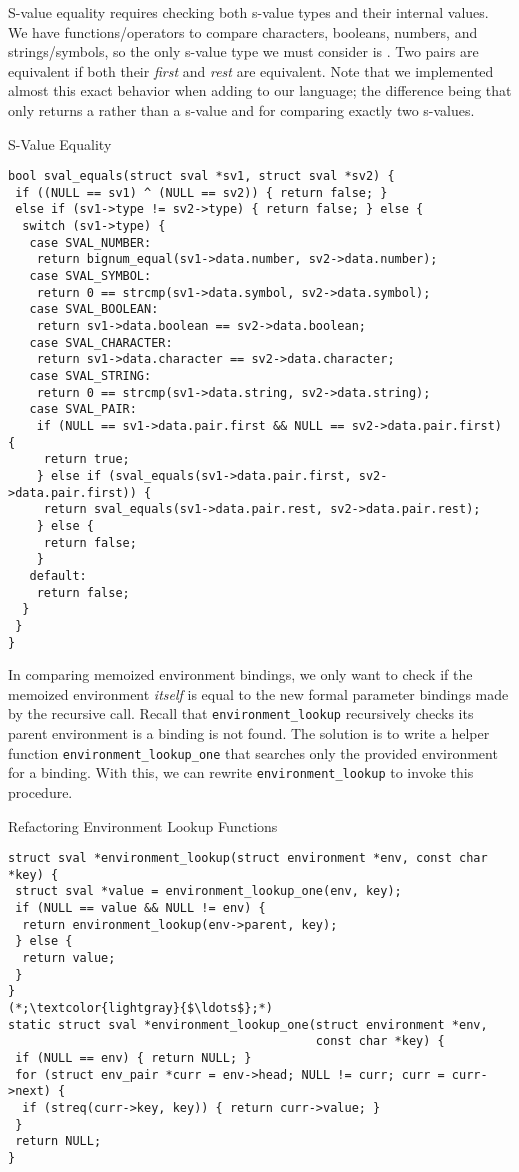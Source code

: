S-value equality requires checking both s-value types and their internal values. We have functions/operators to compare characters, booleans, numbers, and strings/symbols, so the only s-value type we must consider is . Two pairs are equivalent if both their \textit{first} and \textit{rest} are equivalent. Note that we implemented almost this exact behavior when adding  to our language; the difference being that  only returns a  rather than a  s-value and for comparing exactly two s-values.

\begin{cl}[sval.c]{S-Value Equality}
\begin{lstlisting}[language=MyC]
bool sval_equals(struct sval *sv1, struct sval *sv2) {
 if ((NULL == sv1) ^ (NULL == sv2)) { return false; } 
 else if (sv1->type != sv2->type) { return false; } else {
  switch (sv1->type) {
   case SVAL_NUMBER:
    return bignum_equal(sv1->data.number, sv2->data.number);
   case SVAL_SYMBOL:
    return 0 == strcmp(sv1->data.symbol, sv2->data.symbol);
   case SVAL_BOOLEAN:
    return sv1->data.boolean == sv2->data.boolean;
   case SVAL_CHARACTER:
    return sv1->data.character == sv2->data.character;
   case SVAL_STRING:
    return 0 == strcmp(sv1->data.string, sv2->data.string);
   case SVAL_PAIR:
    if (NULL == sv1->data.pair.first && NULL == sv2->data.pair.first) {
     return true;
    } else if (sval_equals(sv1->data.pair.first, sv2->data.pair.first)) {
     return sval_equals(sv1->data.pair.rest, sv2->data.pair.rest);
    } else {
     return false;
    }
   default:
    return false;
  }
 }
}
\end{lstlisting}
\end{cl}

In comparing memoized environment bindings, we only want to check if the memoized environment \textit{itself} is equal to the new formal parameter bindings made by the recursive call. Recall that \texttt{environment\_lookup} recursively checks its parent environment is a binding is not found. The solution is to write a helper function \texttt{environment\_lookup\_one} that searches only the provided environment for a binding. With this, we can rewrite \texttt{environment\_lookup} to invoke this procedure.

\begin{cl}[env.c]{Refactoring Environment Lookup Functions}\begin{lstlisting}[language=MyC]
struct sval *environment_lookup(struct environment *env, const char *key) {
 struct sval *value = environment_lookup_one(env, key);
 if (NULL == value && NULL != env) { 
  return environment_lookup(env->parent, key); 
 } else { 
  return value; 
 }
}
(*;\textcolor{lightgray}{$\ldots$};*)
static struct sval *environment_lookup_one(struct environment *env, 
                                           const char *key) {
 if (NULL == env) { return NULL; }
 for (struct env_pair *curr = env->head; NULL != curr; curr = curr->next) {
  if (streq(curr->key, key)) { return curr->value; }
 }
 return NULL;    
}
\end{lstlisting}\end{cl}

